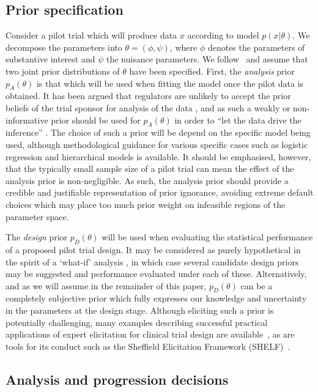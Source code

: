 \documentclass[AMA,STIX1COL]{WileyNJD-v2}
\begin{document}
\subsection{Prior specification}

Consider a pilot trial which will produce data $x$ according to model $p(x | \theta)$. We decompose the parameters into $\theta = (\phi, \psi)$, where $\phi$ denotes the parameters of substantive interest and $\psi$ the nuisance parameters. We follow~\cite{Wang2002} and assume that two joint prior distributions of $\theta$ have been specified. First, the \emph{analysis} prior $p_A(\theta)$ is that which will be used when fitting the model once the pilot data is obtained. It has been argued that regulators are unlikely to accept the prior beliefs of the trial sponsor for analysis of the data \cite{OHagan2005, Walley2015}, and as such a weakly or non-informative prior should be used for $p_A(\theta)$ in order to ``let the data drive the inference'' \cite{Wang2002}. The choice of such a prior will be depend on the specific model being used, although methodological guidance for various specific cases such as logistic regression \cite{Gelman2008} and hierarchical models \cite{Spiegelhalter2001} is available. It should be emphasised, however, that the typically small sample size of a pilot trial can mean the effect of the analysis prior is non-negligible. As such, the analysis prior should provide a credible and justifiable representation of prior ignorance, avoiding extreme default choices which may place too much prior weight on infeasible regions of the parameter space.

The \emph{design} prior $p_D(\theta)$ will be used when evaluating the statistical performance of a proposed pilot trial design. It may be considered as purely hypothetical in the spirit of a `what-if' analysis \cite{Wang2002}, in which case several candidate design priors may be suggested and performance evaluated under each of these. Alternatively, and as we will assume in the remainder of this paper, $p_D(\theta)$ can be a completely subjective prior which fully expresses our knowledge and uncertainty in the parameters at the design stage. Although eliciting such a prior is potentially challenging, many examples describing successful practical applications of expert elicitation for clinical trial design are available~\cite{Walley2015, Crisp2018, Dallow2018}, as are tools for its conduct such as the Sheffield Elicitation Framework (SHELF)~\cite{OHagan2006a}.

\subsection{Analysis and progression decisions}\label{sec:analysis}
\end{document}
